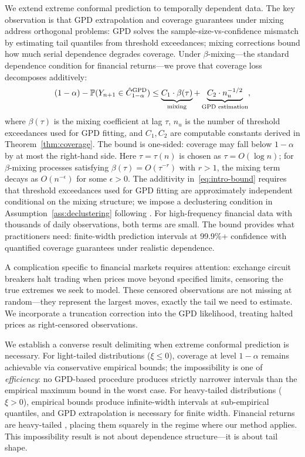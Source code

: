 We extend extreme conformal prediction to temporally dependent data. The key observation is that GPD extrapolation and coverage guarantees under mixing address orthogonal problems: GPD solves the sample-size-vs-confidence mismatch by estimating tail quantiles from threshold exceedances; mixing corrections bound how much serial dependence degrades coverage. Under $\beta$-mixing—the standard dependence condition for financial returns—we prove that coverage loss decomposes additively:
\begin{equation}
\label{eq:intro-bound}
(1-\alpha) - \mathbb{P}(Y_{n+1} \in \hat{C}_{1-\alpha}^{\mathrm{GPD}}) \leq \underbrace{C_1 \cdot \beta(\tau)}_{\text{mixing}} + \underbrace{C_2 \cdot n_u^{-1/2}}_{\text{GPD estimation}},
\end{equation}
where $\beta(\tau)$ is the mixing coefficient at lag $\tau$, $n_u$ is the number of threshold exceedances used for GPD fitting, and $C_1, C_2$ are computable constants derived in Theorem~\ref{thm:coverage}. The bound is one-sided: coverage may fall below $1-\alpha$ by at most the right-hand side. Here $\tau = \tau(n)$ is chosen as $\tau = O(\log n)$; for $\beta$-mixing processes satisfying $\beta(\tau) = O(\tau^{-r})$ with $r > 1$, the mixing term decays as $O(n^{-\epsilon})$ for some $\epsilon > 0$. The additivity in~\eqref{eq:intro-bound} requires that threshold exceedances used for GPD fitting are approximately independent conditional on the mixing structure; we impose a declustering condition in Assumption~\ref{ass:declustering} following \citet{ferro2003inference}. For high-frequency financial data with thousands of daily observations, both terms are small. The bound provides what practitioners need: finite-width prediction intervals at 99.9\%+ confidence with quantified coverage guarantees under realistic dependence.

A complication specific to financial markets requires attention: exchange circuit breakers halt trading when prices move beyond specified limits, censoring the true extremes we seek to model. These censored observations are not missing at random—they represent the largest moves, exactly the tail we need to estimate. We incorporate a truncation correction into the GPD likelihood, treating halted prices as right-censored observations.

We establish a converse result delimiting when extreme conformal prediction is necessary. For light-tailed distributions ($\xi \leq 0$), coverage at level $1-\alpha$ remains achievable via conservative empirical bounds; the impossibility is one of \emph{efficiency}: no GPD-based procedure produces strictly narrower intervals than the empirical maximum bound in the worst case. For heavy-tailed distributions ($\xi > 0$), empirical bounds produce infinite-width intervals at sub-empirical quantiles, and GPD extrapolation is necessary for finite width. Financial returns are heavy-tailed \citep{cont2001empirical}, placing them squarely in the regime where our method applies. This impossibility result is not about dependence structure—it is about tail shape.

